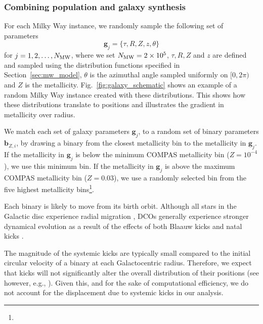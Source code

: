 \subsubsection{Combining population and galaxy synthesis}\label{sec:combining_pop_gal}

For each Milky Way instance, we randomly sample the following set of parameters
\begin{equation}
    \mathbf{g}_{{j}} = \{\tau, R, Z, z, \theta\}
\end{equation}
for $j = 1, 2, \dots, N_{\rm MW}$, where we set $N_{\rm MW} = 2 \times 10^{5}$, $\tau, R, Z$ and $z$ are defined and sampled using the distribution functions specified in Section~\ref{sec:mw_model}, $\theta$ is the azimuthal angle sampled uniformly on $[0, 2\pi)$ and $Z$ is the metallicity. Fig.~\ref{fig:galaxy_schematic} shows an example of a random Milky Way instance created with these distributions. This shows how these distributions translate to positions and illustrates the gradient in metallicity over radius.

We match each set of galaxy parameters $\mathbf{g}_{{j}}$, to a random set of binary parameters $\mathbf{b}_{{Z, i}}$, by drawing a binary from the closest metallicity bin to the metallicity in $\mathbf{g}_{{j}}$. If the metallicity in $\mathbf{g}_{{j}}$ is below the minimum COMPAS metallicity bin ($Z = 10^{-4}$), we use this minimum bin. If the metallicity in $\mathbf{g}_{{j}}$ is above the maximum COMPAS metallicity bin ($Z = 0.03$), we use a randomly selected bin from the five highest metallicity bins\footnote{}.

Each binary is likely to move from its birth orbit. Although all stars in the Galactic disc experience radial migration \citep{Sellwood+2002, Frankel+2018}, DCOs generally experience stronger dynamical evolution as a result of the effects of both Blaauw kicks \citep{Blaauw+1961} and natal kicks \citep[e.g.][]{Hobbs+2005}.

The magnitude of the systemic kicks are typically small compared to the initial circular velocity of a binary at each Galactocentric radius. Therefore, we expect that kicks will not significantly alter the overall distribution of their positions (see however, e.g., \citealt{Brandt+1995, Abbott+2017_GW170817_progenitor}). Given this, and for the sake of computational efficiency, we do not account for the displacement due to systemic kicks in our analysis.

